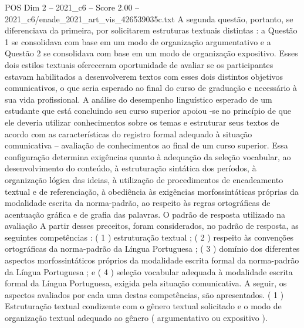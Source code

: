 \begin{textsample}{POS Dim 2 – 2021\_c6 – Score 2.00 – 2021\_c6/enade\_2021\_art\_vis\_426539035c.txt}
A segunda questão, portanto, se diferenciava da primeira, por solicitarem estruturas textuais distintas : a Questão 1 se consolidava com base em um modo de organização argumentativo e a Questão 2 se consolidava com base em um modo de organização expositivo.
Esses dois estilos textuais ofereceram oportunidade de avaliar se os participantes estavam habilitados a desenvolverem textos com esses dois distintos objetivos comunicativos, o que seria esperado ao final do curso de graduação e necessário à sua vida profissional.
A análise do desempenho linguístico esperado de um estudante que está concluindo seu curso superior apoiou -se no princípio de que ele deveria utilizar conhecimentos sobre os temas e estruturar seus textos de acordo com as características do registro formal adequado à situação comunicativa – avaliação de conhecimentos ao final de um curso superior.
Essa configuração determina exigências quanto à adequação da seleção vocabular, ao desenvolvimento do conteúdo, à estruturação sintática dos períodos, à organização lógica das ideias, à utilização de procedimentos de encadeamento textual e de referenciação, à obediência às exigências morfossintáticas próprias da modalidade escrita da norma-padrão, ao respeito às regras ortográficas de acentuação gráfica e de grafia das palavras.
O padrão de resposta utilizado na avaliação A partir desses preceitos, foram considerados, no padrão de resposta, as seguintes competências : ( 1 ) estruturação textual ; ( 2 ) respeito às convenções ortográficas da norma-padrão da Língua Portuguesa ; ( 3 ) domínio dos diferentes aspectos morfossintáticos próprios da modalidade escrita formal da norma-padrão da Língua Portuguesa ; e ( 4 ) seleção vocabular adequada à modalidade escrita formal da Língua Portuguesa, exigida pela situação comunicativa.
A seguir, os aspectos avaliados por cada uma destas competências, são apresentados. ( 1 ) Estruturação textual condizente com o gênero textual solicitado e o modo de organização textual adequado ao gênero ( argumentativo ou expositivo ).

\end{textsample}
